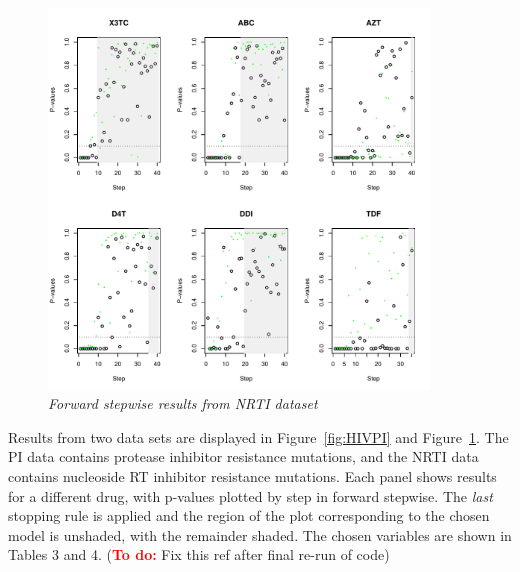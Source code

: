 \documentclass{imsart}
\newcommand{\todo}{\textcolor{red}{\textbf{To do: }}}
\begin{document}
\begin{figure}
\begin{center}
\includegraphics[width=0.9\textwidth]{../figs/HIV_NRTI.pdf}
\caption{\small \it Forward stepwise results from NRTI dataset}
\label{fig:HIVNRTI}
\end{center}
\end{figure}

Results from two data sets are displayed in Figure~\ref{fig:HIVPI} and
Figure~\ref{fig:HIVNRTI}. The PI data contains protease inhibitor
resistance mutations, and the NRTI data contains nucleoside RT inhibitor
resistance mutations.
Each panel shows results for a different drug,
with p-values plotted by step in forward stepwise. 
The \textit{last} stopping rule is applied and the region of the plot
corresponding to the chosen model is unshaded, with the remainder shaded.
The chosen variables are shown in Tables 3 and 4.
(\todo Fix this ref after final re-run of code)




\end{document}
